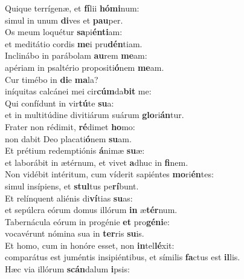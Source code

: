 \evenverse Quique terrígenæ, et \textbf{fí}lii \textbf{hó}\textbf{mi}num:~\*\\
\evenverse simul in unum \textbf{di}ves et \textbf{pau}per.\\
\oddverse Os meum loquétur \textbf{sa}pi\textbf{én}\textbf{ti}am:~\*\\
\oddverse et meditátio cordis \textbf{me}i pru\textbf{dén}tiam.\\
\evenverse Inclinábo in parábolam \textbf{au}rem \textbf{me}am:~\*\\
\evenverse apériam in psaltério propositi\textbf{ó}nem \textbf{me}am.\\
\oddverse Cur timébo in \textbf{di}e \textbf{ma}la?~\*\\
\oddverse iníquitas calcánei mei cir\textbf{cúm}da\textbf{bit} me:\\
\evenverse Qui confídunt in vir\textbf{tú}te \textbf{su}a:~\*\\
\evenverse et in multitúdine divitiárum suárum \textbf{glo}ri\textbf{án}tur.\\
\oddverse Frater non rédimit, \textbf{ré}dimet \textbf{ho}mo:~\*\\
\oddverse non dabit Deo placati\textbf{ó}nem \textbf{su}am.\\
\evenverse Et prétium redemptiónis \textbf{á}nimæ \textbf{su}æ:~\*\\
\evenverse et laborábit in ætérnum, et vivet \textbf{a}dhuc in \textbf{fi}nem.\\
\oddverse Non vidébit intéritum, cum víderit sapiéntes \textbf{mo}ri\textbf{én}tes:~\*\\
\oddverse simul insípiens, et \textbf{stul}tus pe\textbf{rí}bunt.\\
\evenverse Et relínquent aliénis di\textbf{ví}tias \textbf{su}as:~\*\\
\evenverse et sepúlcra eórum domus illórum \textbf{in} æ\textbf{tér}num.\\
\oddverse Tabernácula eórum in progénie \textbf{et} pro\textbf{gé}\textbf{ni}e:~\*\\
\oddverse vocavérunt nómina sua in \textbf{ter}ris \textbf{su}is.\\
\evenverse Et homo, cum in honóre esset, non \textbf{in}tel\textbf{lé}xit:~\*\\
\evenverse comparátus est juméntis insipiéntibus, et símilis \textbf{fa}ctus est \textbf{il}lis.\\
\oddverse Hæc via illórum \textbf{scán}dalum \textbf{i}psis:~\*\\

